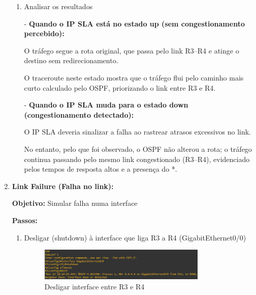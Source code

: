 \documentclass[11pt,english, openright, oneside]{book}
\begin{document}
\begin{enumerate}
\begin{enumerate}
        \item Analisar os resultados \par \vspace{0.2cm}
        
        - \textbf{Quando o IP SLA está no estado up (sem congestionamento percebido):} \par

        O tráfego segue a rota original, que passa pelo link R3–R4 e atinge o destino sem redirecionamento. \par
        O traceroute neste estado mostra que o tráfego flui pelo caminho mais curto calculado pelo OSPF, priorizando o link entre R3 e R4. \par \vspace{0.6cm}

        
        - \textbf{Quando o IP SLA muda para o estado down (congestionamento detectado):} \par
        
        O IP SLA deveria sinalizar a falha ao rastrear atrasos excessivos no link. \par
        No entanto, pelo que foi observado, o OSPF não alterou a rota; o tráfego continua passando pelo mesmo link congestionado (R3–R4), evidenciado pelos tempos de resposta altos e a presença do *.
        
        \pagebreak
      \end{enumerate}

  \item \textbf{Link Failure (Falha no link):} \par \vspace{0.2cm}
      \textbf{Objetivo:} Simular falha numa interface \par \vspace{0.2cm}
      \textbf{Passos:}
        \begin{enumerate}
          \item Desligar (shutdown) à interface que liga R3 a R4 (GigabitEthernet0/0)
          \begin{figure}[H]
            \centering
            \includegraphics[width=0.8\textwidth]{imagens/Tarefa6/30.link_failure_1.png}
            \caption{Desligar interface entre R3 e R4}
            \label{fig:config45}
          \end{figure}   
          

\end{enumerate}
\end{enumerate}
\end{document}
